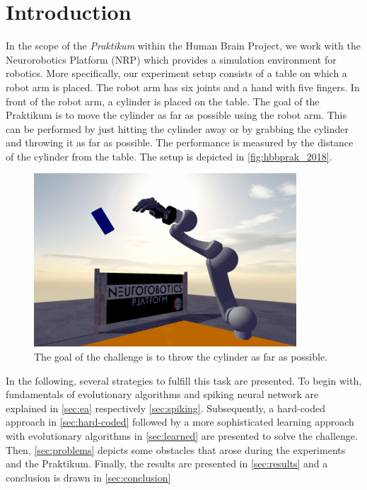 \section{Introduction}
\label{sec:intro}
In the scope of the \textit{Praktikum} within the Human Brain Project, we work with the Neurorobotics Platform (NRP) which provides a simulation environment for robotics.
More specifically, our experiment setup consists of a table on which a robot arm is placed.
The robot arm has six joints and a hand with five fingers.
In front of the robot arm, a cylinder is placed on the table.
The goal of the Praktikum is to move the cylinder as far as possible using the robot arm.
This can be performed by just hitting the cylinder away or by grabbing the cylinder and throwing it as far as possible.
The performance is measured by the distance of the cylinder from the table.
The setup is depicted in \autoref{fig:hbbprak_2018}.

\begin{figure}[h]
\centering
\includegraphics[width=.95\columnwidth]{figures/hbpprak_2018.png}
\caption{The goal of the challenge is to throw the cylinder as far as possible.}
\label{fig:hbbprak_2018}
\end{figure}

In the following, several strategies to fulfill this task are presented.
To begin with, fundamentals of evolutionary algorithms and spiking neural network are explained in \autoref{sec:ea} respectively \autoref{sec:spiking}.
Subsequently, a hard-coded approach in \autoref{sec:hard-coded} followed by a more sophisticated learning approach with evolutionary algorithms in \autoref{sec:learned} are presented to solve the challenge.
Then, \autoref{sec:problems} depicts some obstacles that arose during the experiments and the Praktikum.
Finally, the results are presented in \autoref{sec:results} and a conclusion is drawn in \autoref{sec:conclusion}
